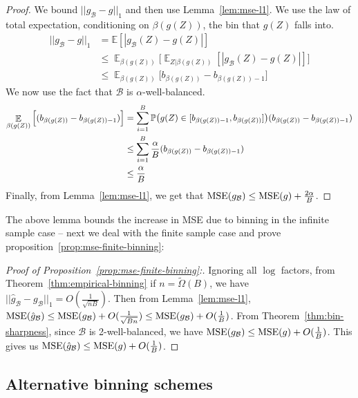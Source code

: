 \begin{proof}
We bound $||g_{\mathcal{B}} - g||_1$ and then use Lemma~\ref{lem:mse-l1}. We use the law of total expectation, conditioning on $\beta(g(Z))$, the bin that $g(Z)$ falls into.
\begin{align*}
||g_{\mathcal{B}} - g||_1 &= \mathbb{E}[|g_{\mathcal{B}}(Z) - g(Z)|] \\
&\leq \mathop{\mathbb{E}}_{\beta(g(Z))} \Big[ \mathop{\mathbb{E}}_{Z | \beta(g(Z))} [ |g_{\mathcal{B}}(Z) - g(Z)| ]\Big]\\
&\leq \mathop{\mathbb{E}}_{\beta(g(Z))} \Big[ b_{\beta(g(Z))} - b_{\beta(g(Z))-1}\Big]
\end{align*}
We now use the fact that $\mathcal{B}$ is $\alpha$-well-balanced.
\begin{align*}
\mathop{\mathbb{E}}_{\beta(g(Z))} \Big[ (b_{\beta(g(Z))} - b_{\beta(g(Z))-1})\Big] &= \sum_{i=1}^B \mathbb{P}\big(g(Z) \in [b_{\beta(g(Z))-1}, b_{\beta(g(Z))}]\big) (b_{\beta(g(Z))} - b_{\beta(g(Z))-1}) \\
&\leq \sum_{i=1}^B \frac{\alpha}{B} (b_{\beta(g(Z))} - b_{\beta(g(Z))-1}) \\
&\leq \frac{\alpha}{B}
\end{align*}
Finally, from Lemma~\ref{lem:mse-l1}, we get that $\textup{MSE}(g_{\mathcal{B}}) \leq \textup{MSE}(g) + \frac{2\alpha}{B}$.
\end{proof}

The above lemma bounds the increase in MSE due to binning in the infinite sample case -- next we deal with the finite sample case and prove proposition~\ref{prop:mse-finite-binning}:

\begin{proof}[Proof of Proposition~\ref{prop:mse-finite-binning}:]
Ignoring all $\log$ factors, from Theorem~\ref{thm:empirical-binning} if $n = \widetilde{\Omega}(B)$, we have $||\hat{g}_{\mathcal{B}} - g_{\mathcal{B}}||_1 = O(\frac{1}{\sqrt{nB}})$. Then from  Lemma~\ref{lem:mse-l1}, $\textup{MSE}(\hat{g}_{\mathcal{B}}) \leq \textup{MSE}(g_{\mathcal{B}}) + O(\frac{1}{\sqrt{Bn}}) \leq \textup{MSE}(g_{\mathcal{B}}) + O(\frac{1}{B})$. From Theorem~\ref{thm:bin-sharpness}, since $\mathcal{B}$ is 2-well-balanced, we have  $\textup{MSE}(g_{\mathcal{B}}) \leq \textup{MSE}(g) + O(\frac{1}{B})$. This gives us $\textup{MSE}(\hat{g}_{\mathcal{B}}) \leq \textup{MSE}(g) + O(\frac{1}{B})$.
\end{proof}

\subsection{Alternative binning schemes}
\label{sec:alt_binning_schemes}

